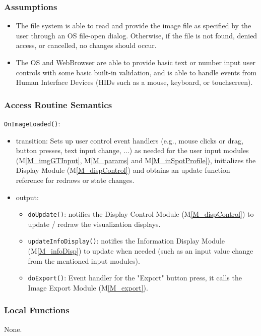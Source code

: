 \documentclass[12pt, titlepage]{article}
\newcommand{\mref}[1]{M\ref{#1}}
\newcommand{\mrefp}[1]{(\mref{#1})}
\newcommand{\mreff}[1]{Module \mrefp{#1}}
\newcommand{\code}[1]{\texttt{#1}}
\begin{document}
\subsubsection{Assumptions}
\begin{itemize}
  \item The file system is able to read and provide the image file as specified by the user through an OS file-open dialog.
  Otherwise, if the file is not found, denied access, or cancelled, no changes should occur.
  \item The OS and WebBrowser are able to provide basic text or number input user controls with some basic built-in validation,
  and is able to handle events from Human Interface Devices (HIDs such as a mouse, keyboard, or touchscreen).
\end{itemize}

\subsubsection{Access Routine Semantics}

\noindent \code{OnImageLoaded()}:
\begin{itemize}
  \item transition: Sets up user control event handlers (e.g., mouse clicks or drag, button presses, text input change, ...)
    as needed for the user input modules (\mref{M_imgGTInput}, \mref{M_params} and \mref{M_inSpotProfile}),
    initializes the Display \mreff{M_dispControl} and obtains an update function reference for redraws or state changes.
  \item output: 
    \begin{itemize}
      \item \code{doUpdate()}: notifies the Display Control \mreff{M_dispControl} to update / redraw the visualization displays.
      \item \code{updateInfoDisplay()}: notifies the Information Display \mreff{M_infoDisp} to update when needed (such as
      an input value change from the mentioned input modules).
      \item \code{doExport()}: Event handler for the "Export" button press, it calls the Image Export \mreff{M_export}.
    \end{itemize}
\end{itemize}

\subsubsection{Local Functions}
None.
\end{document}

